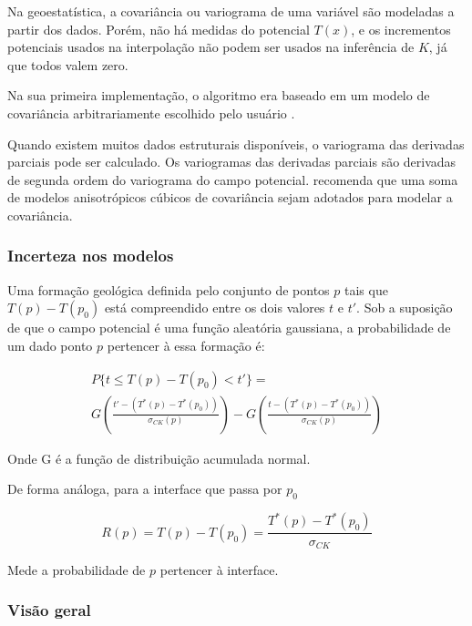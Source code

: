 Na geoestatística, a covariância ou variograma de uma variável são modeladas a partir dos dados. Porém, não há medidas do potencial $T(x)$, e os incrementos potenciais usados na interpolação não podem ser usados na inferência de $K$, já que todos valem zero.

Na sua primeira implementação, o algoritmo era baseado em um modelo de covariância arbitrariamente escolhido pelo usuário \cite{chiles2004modelling}.

Quando existem muitos dados estruturais disponíveis, o variograma das derivadas parciais pode ser calculado. Os variogramas das derivadas parciais são derivadas de segunda ordem do variograma do campo potencial.  recomenda que uma soma de modelos anisotrópicos cúbicos de covariância sejam adotados para modelar a covariância.

\subsubsection{Incerteza nos modelos}

Uma formação geológica definida pelo conjunto de pontos $p$ tais que $T(p)-T(p_0)$ está compreendido entre os dois valores $t$ e $t'$. Sob a suposição de que o campo potencial é uma função aleatória gaussiana, a probabilidade de um dado ponto $p$ pertencer à essa formação é:

\begin{equation}
\begin{gathered}
 P\{t \leq T(p)-T(p_0) < t'\}= \\ 
 G\left(\frac{t'-(T^*(p)-T^*(p_0))}{\sigma_{CK}(p)} \right) - G\left(\frac{t-(T^*(p)-T^*(p_0))}{\sigma_{CK}(p)} \right)
\end{gathered}
\end{equation}

Onde G é a função de distribuição acumulada normal.

De forma análoga, para a interface que passa por $p_0$ 

\begin{equation}
	R(p) = T(p)-T(p_0)=\frac{T^*(p)-T^*(p_0)}{\sigma_{CK}}
\end{equation}

Mede a probabilidade de $p$ pertencer à interface.

\subsubsection{Visão geral}

